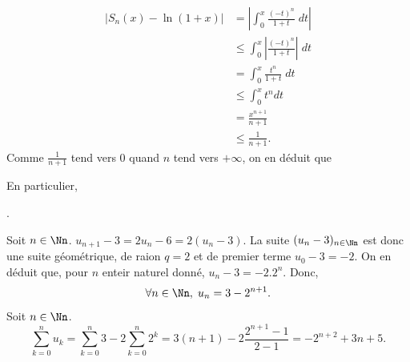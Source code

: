{\begin{enumerate}
{\begin{align*}
|S_n(x)-\ln(1+x)| &= \left|\int_{0}^{x}\frac{(-t)^{n}}{1+t}\;dt\right| \\
&\leq \int_{0}^{x} \left|\frac{(-t)^{n}}{1+t}\right|\;dt \\
&= \int_{0}^{x}\frac{t^n}{1+t}\;dt \\
&\leq \int_{0}^{x}t^{n}dt \\
&= \frac{x^{n+1}}{n+1} \\
&\leq \frac{1}{n+1}.
\end{align*}
Comme $\frac{1}{n+1}$ tend vers $0$ quand $n$ tend vers $+\infty$, on en déduit que
\begin{center}
\end{center}
En particulier, 
\begin{center}
.
\end{center}
Soit $n\in\Nn$. $u_{n+1}-3=2u_n-6=2(u_n-3)$. La suite $(u_n-3)_{n\in\Nn}$ est donc une suite géométrique, de
raion $q=2$ et de premier terme $u_0-3=-2$. On en déduit que, pour $n$ enteir naturel donné, $u_n-3=-2.2^n$. Donc,
$$\forall n\in\Nn,\;u_n=3-2^{n+1}.$$
Soit $n\in\Nn$.
$$\sum_{k=0}^{n}u_k=\sum_{k=0}^{n}3-2\sum_{k=0}^{n}2^k=3(n+1)-2\frac{2^{n+1}-1}{2-1}=-2^{n+2}+3n+5.$$
}
\end{enumerate}
}

